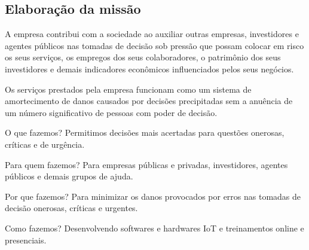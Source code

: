 \subsection{Elaboração da missão}

A empresa contribui com a sociedade ao auxiliar outras empresas, investidores 
e agentes públicos nas tomadas de decisão sob pressão que possam colocar em 
risco os seus serviços, os empregos dos seus colaboradores, o patrimônio 
dos seus investidores e demais indicadores econômicos influenciados pelos 
seus negócios.

Os serviços prestados pela empresa funcionam como um sistema de amortecimento 
de danos causados por decisões precipitadas sem a anuência de um número 
significativo de pessoas com poder de decisão.

O que fazemos? Permitimos decisões mais acertadas para questões onerosas, 
críticas e de urgência.

Para quem fazemos? Para empresas públicas e privadas, investidores, agentes 
públicos e demais grupos de ajuda.

Por que fazemos? Para minimizar os danos provocados por erros nas tomadas de 
decisão onerosas, críticas e urgentes.

Como fazemos? Desenvolvendo softwares e hardwares IoT e treinamentos online e 
presenciais.
